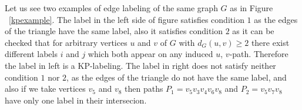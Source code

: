 \documentclass[12pt,a4paper,titlepage,openany]{report}
\begin{document}
\begin{example}
Let us see two examples of edge labeling of the same graph $G$ as in Figure ~\ref{kpexample}.\newline
The label in the left side of figure satisfies condition $1$ as the edges of the triangle have the same label, also it satisfies condition $2$ as it can be checked that for arbitrary vertices $u$ and $v$ of $G$ with $d_G(u,v) \geq 2$ there exist different labels $i$ and $j$ which both appear on any induced $u$, $v$-path. Therefore the label in left is a KP-labeling.\newline
The label in right does not satisfy neither condition $1$ nor $2$, as the edges of the triangle do not have the same label, and also if we take vertices $v_5$ and $v_8$ then paths $P_1=v_5v_3v_4v_6v_8$ and $P_2=v_5v_7v_8$ have only one label in their intersecion.
\end{example}
\end{document}
